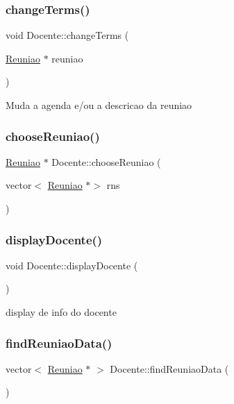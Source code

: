 \subsubsection{\texorpdfstring{change\+Terms()}{changeTerms()}}
{\footnotesize\ttfamily void Docente\+::change\+Terms (\begin{DoxyParamCaption}\item[{\hyperlink{class_reuniao}{Reuniao} $\ast$}]{reuniao }\end{DoxyParamCaption})}

Muda a agenda e/ou a descricao da reuniao \hypertarget{class_docente_a5269740fc625141805801d499f377dad}{}\label{class_docente_a5269740fc625141805801d499f377dad} 
\subsubsection{\texorpdfstring{choose\+Reuniao()}{chooseReuniao()}}
{\footnotesize\ttfamily \hyperlink{class_reuniao}{Reuniao} $\ast$ Docente\+::choose\+Reuniao (\begin{DoxyParamCaption}\item[{vector$<$ \hyperlink{class_reuniao}{Reuniao} $\ast$$>$}]{rns }\end{DoxyParamCaption})}

\hypertarget{class_docente_ae0b73b4b0d10c25c23eb678f74e3c0e8}{}\label{class_docente_ae0b73b4b0d10c25c23eb678f74e3c0e8} 
\subsubsection{\texorpdfstring{display\+Docente()}{displayDocente()}}
{\footnotesize\ttfamily void Docente\+::display\+Docente (\begin{DoxyParamCaption}{ }\end{DoxyParamCaption})}

display de info do docente \hypertarget{class_docente_a41eda045287485cfdc5f94ebf1c1f44b}{}\label{class_docente_a41eda045287485cfdc5f94ebf1c1f44b} 
\subsubsection{\texorpdfstring{find\+Reuniao\+Data()}{findReuniaoData()}}
{\footnotesize\ttfamily vector$<$ \hyperlink{class_reuniao}{Reuniao} $\ast$ $>$ Docente\+::find\+Reuniao\+Data (\begin{DoxyParamCaption}{ }\end{DoxyParamCaption})}

